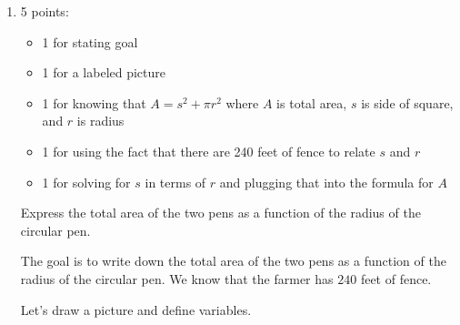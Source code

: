 \documentclass{article}
\begin{document}
\begin{enumerate}
  \begin{enumerate}
  \item
    \begin{grading}
      5 points:
      \begin{itemize}[nosep]
      \item 1 for stating goal
      \item 1 for a labeled picture
      \item 1 for knowing that $A = s^2 + \pi r^2$ where $A$ is total area, $s$ is side of square, and $r$ is radius
      \item 1 for using the fact that there are 240 feet of fence to relate $s$ and $r$
      \item 1 for solving for $s$ in terms of $r$ and plugging that into the formula for $A$
      \end{itemize}
    \end{grading}

    \begin{problem}[\vfill]
      Express the total area of the two pens as a function of the radius of the circular pen.
    \end{problem}

    \begin{solution}
      The goal is to write down the total area of the two pens as a function of the 
      radius of the circular pen. We know that the farmer has $240$ feet of fence.

      Let's draw a picture and define variables.

      \begin{center}
      \end{center}


\end{solution}
\end{enumerate}
\end{enumerate}
\end{document}
